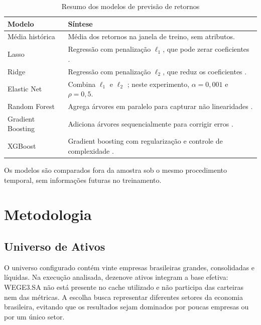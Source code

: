\documentclass[12pt,a4paper]{article}
\begin{document}
\begin{table}[H]
\centering
\small
\begin{tabular}{@{}p{}p{}@{}}
\toprule
Modelo & Síntese \\
\midrule
Média histórica & Média dos retornos na janela de treino, sem atributos. \\
Lasso & Regressão com penalização $\ell_1$, que pode zerar coeficientes \cite{tibshirani1996}. \\
Ridge & Regressão com penalização $\ell_2$, que reduz os coeficientes \cite{hoerl1970}. \\
Elastic Net & Combina $\ell_1$ e $\ell_2$ \cite{zou2005}; neste experimento, $\alpha=0{,}001$ e $\rho=0{,}5$. \\
Random Forest & Agrega árvores em paralelo para capturar não linearidades \cite{breiman2001}. \\
Gradient Boosting & Adiciona árvores sequencialmente para corrigir erros \cite{friedman2001}. \\
XGBoost & Gradient boosting com regularização e controle de complexidade \cite{chen2016}. \\
\bottomrule
\end{tabular}
\caption{Resumo dos modelos de previsão de retornos}
\label{tab:modelos}
\end{table}

Os modelos são comparados fora da amostra sob o mesmo procedimento temporal, sem informações futuras no treinamento.



\section{Metodologia}

\subsection{Universo de Ativos}

O universo configurado contém vinte empresas brasileiras grandes, consolidadas e líquidas. Na execução analisada, dezenove ativos integram a base efetiva: WEGE3.SA não está presente no cache utilizado e não participa das carteiras nem das métricas. A escolha busca representar diferentes setores da economia brasileira, evitando que os resultados sejam dominados por poucas empresas ou por um único setor.
\end{document}
